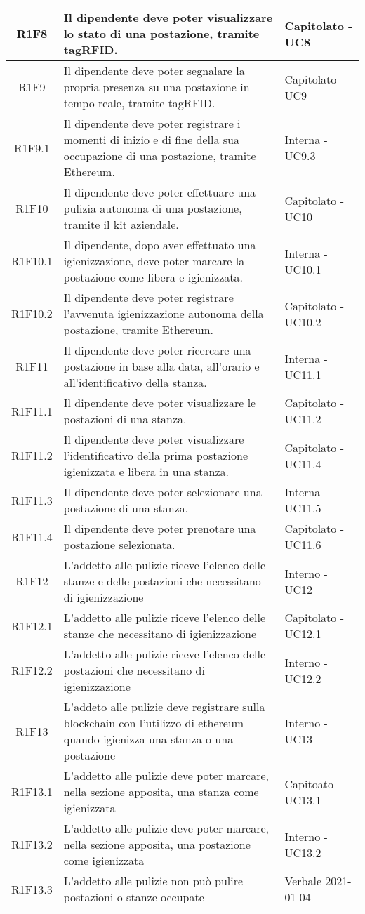 \begin{center}
\begin{longtable}{|c|p{10cm}|p{4cm}|}
					\hline
					R1F8&Il dipendente deve poter visualizzare lo stato di una postazione, tramite tagRFID.	&Capitolato - UC8 	\\
					\hline
			R1F9&Il dipendente deve poter segnalare la propria presenza su una postazione in tempo reale, tramite tagRFID.	&Capitolato - UC9 	\\
		\hline
		R1F9.1&Il dipendente deve poter registrare i momenti di inizio e di fine della sua occupazione di una postazione, tramite Ethereum.	&Interna - UC9.3 	\\
		\hline	
		R1F10&Il dipendente deve poter effettuare una pulizia autonoma di una postazione, tramite il kit aziendale.	&Capitolato - UC10	\\
		\hline		
		R1F10.1&Il dipendente, dopo aver effettuato una igienizzazione, deve poter marcare la postazione come libera e igienizzata.	&Interna - UC10.1	\\
		\hline	
		R1F10.2&Il dipendente deve poter registrare l'avvenuta igienizzazione autonoma della postazione, tramite Ethereum.	&Capitolato - UC10.2	\\
		\hline	
		R1F11&Il dipendente deve poter ricercare una postazione in base alla data, all'orario e all'identificativo della stanza.	&Interna - UC11.1	\\
		\hline
		R1F11.1&Il dipendente deve poter visualizzare le postazioni di una stanza.	&Capitolato - UC11.2	\\
		\hline
		R1F11.2&Il dipendente deve poter visualizzare l'identificativo della prima postazione igienizzata e libera in una stanza.	&Capitolato - UC11.4	\\
		\hline
		R1F11.3&Il dipendente deve poter selezionare una postazione di una stanza.	&Interna - UC11.5	\\
		\hline
		R1F11.4&Il dipendente deve poter prenotare una postazione selezionata.	&Capitolato - UC11.6	\\
		\hline
R1F12&L'addetto alle pulizie riceve l'elenco delle stanze e delle postazioni che necessitano di igienizzazione	& Interno - UC12	\\
						\hline
			R1F12.1&	L'addetto alle pulizie riceve l'elenco delle stanze che necessitano di igienizzazione& 	Capitolato - UC12.1\\
					\hline
			R1F12.2&L'addetto alle pulizie riceve l'elenco delle postazioni che necessitano di igienizzazione	& Interno - UC12.2	\\
					\hline
R1F13&L'addeto alle pulizie deve registrare sulla blockchain con l'utilizzo di ethereum quando igienizza una stanza o una postazione	& Interno - UC13	\\
					\hline
R1F13.1&L'addetto alle pulizie deve poter marcare, nella sezione apposita, una stanza come igienizzata	& Capitoato - UC13.1	\\
						\hline
			R1F13.2&L'addetto alle pulizie deve poter marcare, nella sezione apposita, una postazione come igienizzata	&Interno - UC13.2 	\\
					\hline
			R1F13.3&L'addetto alle pulizie non può pulire postazioni o stanze occupate	& Verbale 2021-01-04	\\
					\hline
						

\end{longtable}
\end{center}
